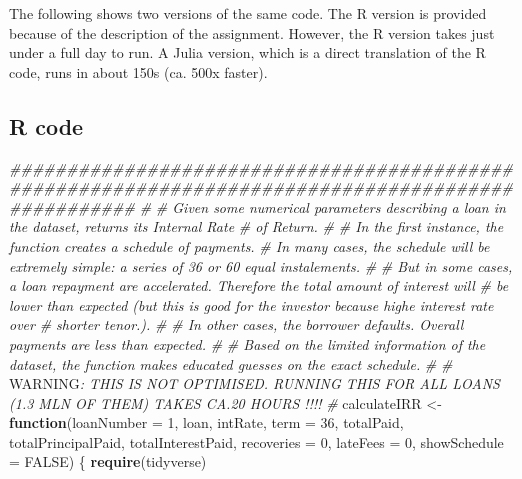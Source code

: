 \documentclass[11pt,]{report}
\newenvironment{Shaded}{\begin{snugshade}}{\end{snugshade}}
\newcommand{\AlertTok}[1]{\textcolor[rgb]{0.94,0.16,0.16}{#1}}
\newcommand{\CommentTok}[1]{\textcolor[rgb]{0.56,0.35,0.01}{\textit{#1}}}
\newcommand{\ControlFlowTok}[1]{\textcolor[rgb]{0.13,0.29,0.53}{\textbf{#1}}}
\newcommand{\DataTypeTok}[1]{\textcolor[rgb]{0.13,0.29,0.53}{#1}}
\newcommand{\DecValTok}[1]{\textcolor[rgb]{0.00,0.00,0.81}{#1}}
\newcommand{\KeywordTok}[1]{\textcolor[rgb]{0.13,0.29,0.53}{\textbf{#1}}}
\newcommand{\NormalTok}[1]{#1}
\newcommand{\OtherTok}[1]{\textcolor[rgb]{0.56,0.35,0.01}{#1}}
\newcommand{\StringTok}[1]{\textcolor[rgb]{0.31,0.60,0.02}{#1}}
\begin{document}
The following shows two versions of the same code. The R version is provided because of the description of the assignment. However, the R version takes just under a full day to run. A Julia version, which is a direct translation of the R code, runs in about 150s (ca. 500x faster).

\hypertarget{r-code}{%
\subsection{R code}\label{r-code}}

\begin{Shaded}
\begin{Highlighting}[numbers=left,,]
\CommentTok{###################################################################################################}
\CommentTok{#}
\CommentTok{# Given some numerical parameters describing a loan in the dataset, returns its Internal Rate}
\CommentTok{# of Return.}
\CommentTok{#}
\CommentTok{# In the first instance, the function creates a schedule of payments.}
\CommentTok{# In many cases, the schedule will be extremely simple: a series of 36 or 60 equal instalements.}
\CommentTok{#}
\CommentTok{# But in some cases, a loan repayment are accelerated. Therefore the total amount of interest will}
\CommentTok{# be lower than expected (but this is good for the investor because highe interest rate over}
\CommentTok{# shorter tenor.).}
\CommentTok{#}
\CommentTok{# In other cases, the borrower defaults. Overall payments are less than expected.}
\CommentTok{#}
\CommentTok{# Based on the limited information of the dataset, the function makes educated guesses on the exact schedule.}
\CommentTok{#}
\CommentTok{# }\AlertTok{WARNING}\CommentTok{: THIS IS NOT OPTIMISED. RUNNING THIS FOR ALL LOANS (1.3 MLN OF THEM) TAKES CA.20 HOURS !!!!}
\CommentTok{#}
\NormalTok{calculateIRR <-}\StringTok{ }\ControlFlowTok{function}\NormalTok{(}\DataTypeTok{loanNumber =} \DecValTok{1}\NormalTok{,}
\NormalTok{                         loan,}
\NormalTok{                         intRate,}
                         \DataTypeTok{term =} \DecValTok{36}\NormalTok{,}
\NormalTok{                         totalPaid,}
\NormalTok{                         totalPrincipalPaid,}
\NormalTok{                         totalInterestPaid,}
                         \DataTypeTok{recoveries =} \DecValTok{0}\NormalTok{,}
                         \DataTypeTok{lateFees =} \DecValTok{0}\NormalTok{,}
                         \DataTypeTok{showSchedule =} \OtherTok{FALSE}\NormalTok{) \{}
  \KeywordTok{require}\NormalTok{(tidyverse)}
  

\end{Highlighting}
\end{Shaded}
\end{document}
